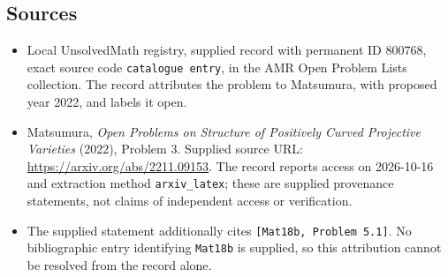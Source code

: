 \documentclass[11pt]{article}
\begin{document}
\subsection{Sources}
\begin{itemize}
\item Local UnsolvedMath registry, supplied record with permanent ID \(800768\), exact source code \texttt{catalogue entry}, in the AMR Open Problem Lists collection. The record attributes the problem to Matsumura, with proposed year 2022, and labels it open.
\item Matsumura, \emph{Open Problems on Structure of Positively Curved Projective Varieties} (2022), Problem 3. Supplied source URL: \url{https://arxiv.org/abs/2211.09153}. The record reports access on 2026-10-16 and extraction method \texttt{arxiv\_latex}; these are supplied provenance statements, not claims of independent access or verification.
\item The supplied statement additionally cites \texttt{[Mat18b, Problem 5.1]}. No bibliographic entry identifying \texttt{Mat18b} is supplied, so this attribution cannot be resolved from the record alone.
\end{itemize}
\end{document}
